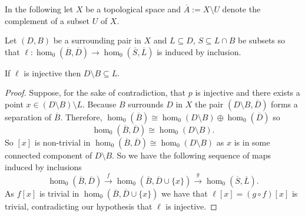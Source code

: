 In the following let $X$ be a topological space and $\overline{A} := X\setminus U$ denote the complement of a subset $U$ of $X$.

\begin{lemma}\label{lem:coverage}
  Let $(D, B)$ be a surrounding pair in $X$ and $L\subseteq D$, $S\subseteq L\cap B$ be subsets so that $\ell: \hom_0(\overline{B}, \overline{D})\to \hom_0(\overline{S}, \overline{L})$ is induced by inclusion.

  If $\ell$ is injective then $D\setminus B\subseteq L$.
\end{lemma}
\begin{proof}
    Suppose, for the sake of contradiction, that $p$ is injective and there exists a point $x\in (D\setminus B)\setminus L$.
    Because $B$ surrounds $D$ in $X$ the pair $(D\setminus B, \overline{D})$ forms a separation of $\overline{B}$.
    Therefore, $\hom_0(\overline{B})\cong \hom_0(D\setminus B)\oplus \hom_0(\overline{D})$ so
    \[ \hom_0(\overline{B}, \overline{D})\cong \hom_0(D\setminus B). \]
    So $[x]$ is non-trivial in $\hom_0(\overline{B},\overline{D})\cong \hom_0(D\setminus B)$ as $x$ is in some connected component of $D\setminus B$.
    So we have the following sequence of maps induced by inclusions
    \[ \hom_0(\overline{B},\overline{D})\xrightarrow{f} \hom_0(\overline{B},\overline{D}\cup\{x\})\xrightarrow{g} \hom_0(\overline{S},\overline{L}).\]
    As $f[x]$ is trivial in $\hom_0(\overline{B},\overline{D}\cup\{x\})$ we have that $\ell[x] = (g\circ f)[x]$ is trivial, contradicting our hypothesis that $\ell$ is injective.
\end{proof}

